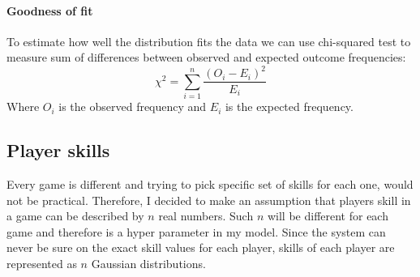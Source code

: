 \documentclass[12pt,a4paper]{book}
\begin{document}
\paragraph{Goodness of fit}
To estimate how well the distribution fits the data we can use chi-squared test to measure sum of differences between observed and expected outcome frequencies:
\begin{equation}
\chi^2 = \sum_{i=1}^{n} \frac{(O_i - E_i)^2}{E_i}
\end{equation}
Where $O_i$ is the observed frequency and $E_i$ is the expected frequency.
\subsection{Player skills}
Every game is different and trying to pick specific set of skills for each one, would not be practical.
Therefore, I decided to make an assumption that players skill in a game can be described by $n$ real numbers.
Such $n$ will be different for each game and therefore is a hyper parameter in my model.
Since the system can never be sure on the exact skill values for each player, skills of each player are represented as $n$ Gaussian distributions.
\end{document}

